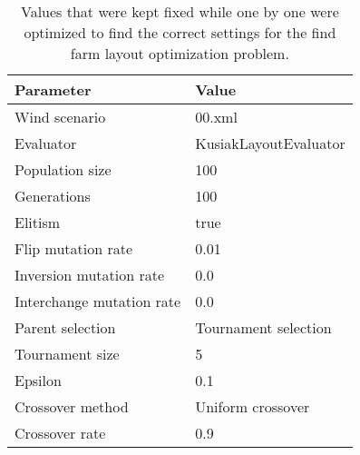 \begin{table}
\centering
\caption{Values that were kept fixed while one by one were optimized to find the correct settings for the find farm layout optimization problem.}
\label{table:fixed settings}
\begin{tabular}{l|l}
\textbf{Parameter} & \textbf{Value} \\ 
\hline 
Wind scenario & 00.xml \\ 
Evaluator & KusiakLayoutEvaluator \\ 
Population size & 100 \\  
Generations & 100 \\ 
Elitism & true \\  
Flip mutation rate & 0.01 \\ 
Inversion mutation rate & 0.0 \\ 
Interchange mutation rate & 0.0 \\ 
Parent selection & Tournament selection \\ 
Tournament size & 5 \\ 
Epsilon & 0.1 \\  
Crossover method & Uniform crossover \\ 
Crossover rate & 0.9 \\ 
\end{tabular} 
\end{table}

